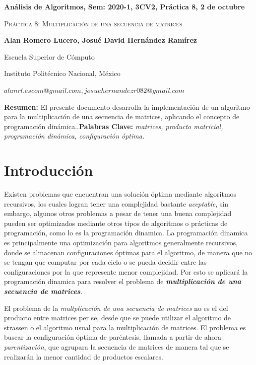 \documentclass[12pt,twoside]{article}
\date{}
\begin{document}
\centerline{\bf An\'alisis de Algoritmos, Sem: 2020-1, 3CV2, Pr\'actica 8, 2 de octubre}
\centerline{}
\centerline{}
\begin{center}
\Large{\textsc{Pr\'actica 8: Multiplicaci\'on de una secuencia de matrices}}
\end{center}
\centerline{\bf{Alan Romero Lucero, Josu\'e David Hern\'andez Ram\'irez}}
\centerline{}
\centerline{Escuela Superior de C\'omputo}
\centerline{Instituto Polit\'ecnico Nacional, M\'exico}
\centerline{$alanrl.escom@gmail.com, josuehernandezr082@gmail.com$}
\newtheorem{Theorem}{\quad Theorem}[section]
\newtheorem{Definition}[Theorem]{\quad Definition}
\newtheorem{Corollary}[Theorem]{\quad Corollary}
\newtheorem{Lemma}[Theorem]{\quad Lemma}
\newtheorem{Example}[Theorem]{\quad Example}
\bigskip
\textbf{Resumen:} El presente documento desarrolla la implementaci\'on de un algoritmo para la multiplicaci\'on de una secuencia de matrices, aplicando el concepto de programaci\'on din\'amica..{\bf Palabras Clave:} {\textit{matrices, producto matricial, programaci\'on din\'amica, configuraci\'on \'optima.}}
\section{Introducci\'on}
Existen problemas que encuentran una soluci\'on \'optima mediante algoritmos recursivos, los cuales logran tener una complejidad bastante \textit{aceptable}, sin embargo, algunos otros problemas a pesar de tener una buena complejidad pueden ser optimizados mediante otros tipos de algoritmos o pr\'acticas de programaci\'on, como lo es la programaci\'on dinamica. La programaci\'on dinamica es principalmente una optimizaci\'on para algoritmos generalmente recursivos, donde se almacenan configuraciones \'optimas para el algoritmo, de manera que no se tengan que computar por cada ciclo o se pueda decidir entre las configuraciones por la que represente menor complejidad. Por esto se aplicar\'a la programaci\'on dinamica para resolver el problema de \textit{\textbf{multiplicaci\'on de una secuencia de matrices}}.

El problema de la \textit{multplicaci\'on de una secuencia de matrices} no es el del producto entre matrices per se, desde que se puede utilizar el algoritmo de strassen o el algoritmo usual para la multiplicaci\'on de matrices. El problema es buscar la configuraci\'on \'optima de par\'entesis, llamada a partir de ahora \textit{parentizaci\'on}, que agrupara la secuencia de matrices de manera tal que se realizar\'an la menor cantidad de productos escalares.
\end{document}
